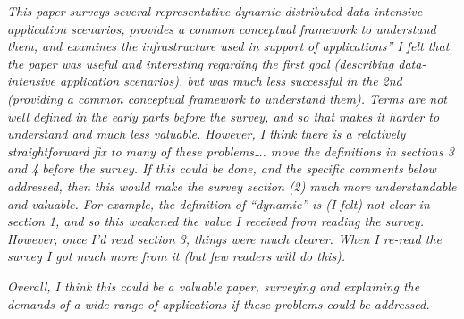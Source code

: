 \documentclass{article}
\begin{document}

\emph{This paper surveys several representative dynamic distributed data-intensive application scenarios, provides a common conceptual framework to understand them, and examines the infrastructure used in support of applications” I felt that the paper was useful and interesting regarding the first goal (describing data-intensive application scenarios), but was much less successful in the 2nd (providing a common conceptual framework to understand them). Terms are not well defined in the early parts before the survey, and so that makes it harder to understand and much less valuable. However, I think there is a relatively straightforward fix to many of these problems…. move the definitions in sections 3 and 4 before the survey. If this could be done, and the specific comments below addressed, then this would make the survey section (2) much more understandable and valuable. For example, the definition of “dynamic” is (I felt) not clear in section 1, and so this weakened the value I received from reading the survey. However, once I’d read section 3, things were much clearer. When I re-read the survey I got much more from it (but few readers will do this).}

\emph{Overall, I think this could be a valuable paper, surveying and explaining the demands of a wide range of applications if these problems could be addressed.}
\end{document}
